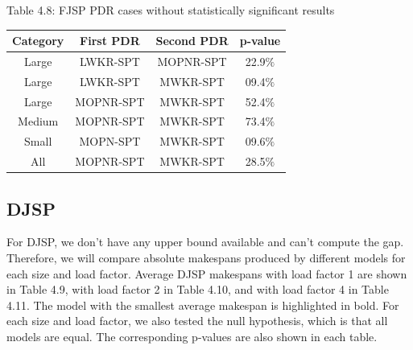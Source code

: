 \begin{table}
    Table 4.8: FJSP PDR cases without statistically significant results\\
    \vspace{1mm}
    \footnotesize 
    \begin{tabular}{cccc}
        \toprule
        Category & First PDR & Second PDR & p-value \\
        \midrule
        Large & LWKR-SPT & MOPNR-SPT & 22.9$\%$ \\
        Large & LWKR-SPT & MWKR-SPT & 09.4$\%$ \\
        Large & MOPNR-SPT & MWKR-SPT & 52.4$\%$ \\
        \hline
        Medium & MOPNR-SPT & MWKR-SPT & 73.4$\%$ \\
        \hline
        Small & MOPN-SPT & MWKR-SPT & 09.6$\%$ \\
        \hline
        All & MOPNR-SPT & MWKR-SPT & 28.5$\%$ \\
        \bottomrule
        \end{tabular}
\end{table}

\subsection{DJSP}

For DJSP, we don't have any upper bound available and can't compute the gap. Therefore, we will compare absolute makespans produced by different models for each size and load factor. Average DJSP makespans with load factor 1 are shown in Table 4.9, with load factor 2 in Table 4.10, and with load factor 4 in Table 4.11. The model with the smallest average makespan is highlighted in bold. For each size and load factor, we also tested the null hypothesis, which is that all models are equal. The corresponding p-values are also shown in each table.


